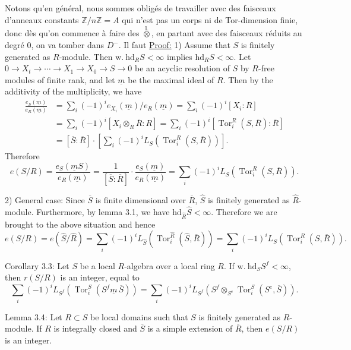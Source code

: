 Notons qu'en général, nous sommes obligés de travailler avec des faisceaux d'anneaux constants $\mathbb Z/n\mathbb Z=A$ qui n'est pas un corps ni de Tor-dimension  finie, donc dès qu'on commence à faire des $\overset{\mathbb L}{\otimes}$,  en partant avec des faisceaux réduits au degré $0$, on va tomber dans $D^-$. Il faut
\uline{Proof:} 1) Assume that $S$ is finitely generated as $R$-module. Then $\mathrm{w.\ hd}_R S<\infty$ implies $\mathrm{hd}_R S<\infty$. Let $0\longrightarrow X_t\longrightarrow\cdots\longrightarrow X_1\longrightarrow X_0\longrightarrow S\longrightarrow0$ be an acyclic resolution of $S$ by $R$-free modules of finite rank, and let $\underline m$ be the maximal ideal of $R$. Then by the additivity of the multiplicity, we have
\[
\begin{aligned}
\frac{e_S(\underline m)}{e_R(\underline m)}
&=\sum_i(-1)^i e_{X_i}(\underline m)/e_R(\underline m)=\sum_i(-1)^i[X_i:R]\\
&=\sum_i(-1)^i[X_i\otimes_R\overline R:R]=\sum_i(-1)^i[\operatorname{Tor}_i^R(S,\overline R):\overline R]\\
&=[\overline S:\overline R]\cdot[\sum_i(-1)^iL_S(\operatorname{Tor}_i^R(S,\overline R))].
\end{aligned}
\]
Therefore
\[
e(S/R)=\frac{e_S(\underline m S)}{e_R(\underline m)}=\frac1{[\overline S:\overline R]}\cdot\frac{e_S(\underline m)}{e_R(\underline m)}=\sum_i(-1)^iL_S(\operatorname{Tor}_i^R(S,\overline R)).
\]

2) General case: Since $\overline S$ is finite dimensional over $\overline R$, $\widehat S$ is finitely generated as $\widehat R$-module. Furthermore, by lemma 3.1, we have $\mathrm{hd}_{\widehat R}\widehat S<\infty$. Therefore we are brought to the above situation and hence
\[
e(S/R)=e(\widehat S/\widehat R)=\sum_i(-1)^iL_{\widehat S}(\operatorname{Tor}_i^{\widehat R}(\widehat S,\overline R))=\sum_i(-1)^iL_S(\operatorname{Tor}_i^R(S,\overline R)).
\]

Corollary 3.3: Let $S$ be a local $R$-algebra over a local ring $R$. If $\mathrm{w.\ hd}_S S^f<\infty$, then $r(S/R)$ is an integer, equal to
\[
\sum_i(-1)^iL_{S^f}(\operatorname{Tor}_i^S(S^f\underline m\,\overline S))=\sum_i(-1)^iL_{S^f}(S^f\otimes_{S^e}\operatorname{Tor}_i^S(S^e,\overline S)).
\]

Lemma 3.4: Let $R\subset S$ be local domains such that $S$ is finitely generated as $R$-module. If $R$ is integrally closed and $\overline S$ is a simple extension of $\overline R$, then $e(S/R)$ is an integer.

